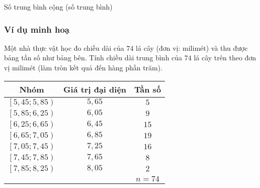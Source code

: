 \setcounter{subsubsection}{0}
\setcounter{ex}{0}
\setcounter{bt}{0}
\begin{dang}{Số trung bình cộng (số trung bình)}
\end{dang}
\subsubsection{Ví dụ minh hoạ}
\begin{vd}%
	\immini
	{
		Một nhà thực vật học đo chiều dài của $74$ lá cây (đơn vị: milimét) và thu được bảng tần số như bảng bên. Tính chiều dài trung bình của $74$ lá cây trên theo đơn vị milimét (làm tròn kết quả đến hàng phần trăm).
	}
	{
		\begin{tabular}{|c|c|c|}
			\hline
			\textbf{Nhóm} & \textbf{Giá trị đại diện} & \textbf{Tần số}\\ 
			\hline
			$\left[5{,}45;5{,}85\right)$ & $5{,}65$ & $5$\\
			$\left[5{,}85;6{,}25\right)$ & $6{,}05$ & $9$\\
			$\left[6{,}25;6{,}65\right)$ & $6{,}45$ & $15$\\
			$\left[6{,}65;7{,}05\right)$ & $6{,}85$ & $19$\\
			$\left[7{,}05;7{,}45\right)$ & $7{,}25$ & $16$\\
			$\left[7{,}45;7{,}85\right)$ & $7{,}65$ & $8$\\
			$\left[7{,}85;8{,}25\right)$ & $8{,}05$ & $2$\\
			\hline
			&  & $n = 74$\\
			\hline
		\end{tabular}
	}
\end{vd}
